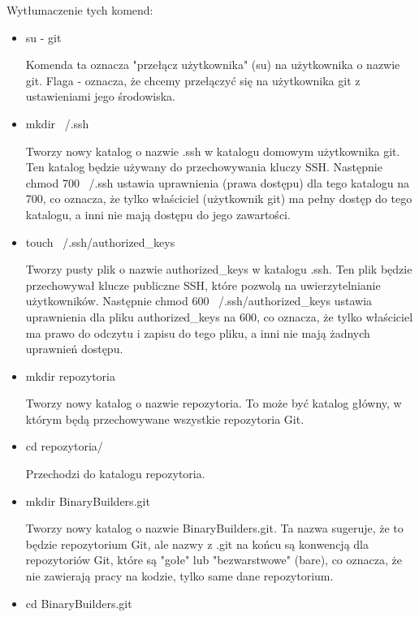 \documentclass[a4paper]{article}
\begin{document}
\newpage
Wytłumaczenie tych komend:
\begin{itemize}
      
      \item su - git
      
      Komenda ta oznacza "przełącz użytkownika" (su) na użytkownika o nazwie git. Flaga - oznacza, że chcemy przełączyć się na użytkownika git z ustawieniami jego środowiska.
      
      \item mkdir ~/.ssh
      
      Tworzy nowy katalog o nazwie .ssh w katalogu domowym użytkownika git. Ten katalog będzie używany do przechowywania kluczy SSH. Następnie chmod 700 ~/.ssh ustawia uprawnienia (prawa dostępu) dla tego katalogu na 700, co oznacza, że tylko właściciel (użytkownik git) ma pełny dostęp do tego katalogu, a inni nie mają dostępu do jego zawartości.
      
      \item touch ~/.ssh/authorized\_keys
      
      Tworzy pusty plik o nazwie authorized\_keys w katalogu .ssh. Ten plik będzie przechowywał klucze publiczne SSH, które pozwolą na uwierzytelnianie użytkowników. Następnie chmod 600 ~/.ssh/authorized\_keys ustawia uprawnienia dla pliku authorized\_keys na 600, co oznacza, że tylko właściciel ma prawo do odczytu i zapisu do tego pliku, a inni nie mają żadnych uprawnień dostępu.
      
      \item mkdir repozytoria
      
      Tworzy nowy katalog o nazwie repozytoria. To może być katalog główny, w którym będą przechowywane wszystkie repozytoria Git.
      
      \item cd repozytoria/
      
      Przechodzi do katalogu repozytoria.
      
      \item mkdir BinaryBuilders.git
      
      Tworzy nowy katalog o nazwie BinaryBuilders.git. Ta nazwa sugeruje, że to będzie repozytorium Git, ale nazwy z .git na końcu są konwencją dla repozytoriów Git, które są "gołe" lub "bezwarstwowe" (bare), co oznacza, że nie zawierają pracy na kodzie, tylko same dane repozytorium.
      
      \item cd BinaryBuilders.git
      

\end{itemize}
\end{document}
